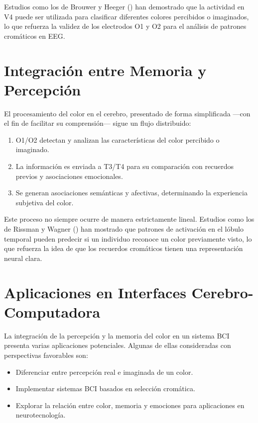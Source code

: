 Estudios como los de Brouwer y Heeger (\citeyear{Brouwer_Heeger_2013}) han demostrado que la actividad en V4 puede ser utilizada para clasificar diferentes colores percibidos o imaginados, lo que refuerza la validez de los electrodos O1 y O2 para el análisis de patrones cromáticos en EEG.

\newpage

\section{Integración entre Memoria y Percepción}
El procesamiento del color en el cerebro, presentado de forma simplificada —con el fin de facilitar su comprensión— sigue un flujo distribuido:
\begin{enumerate}
    \item O1/O2 detectan y analizan las características del color percibido o imaginado.
    \item La información es enviada a T3/T4 para su comparación con recuerdos previos y asociaciones emocionales.
    \item Se generan asociaciones semánticas y afectivas, determinando la experiencia subjetiva del color.
\end{enumerate}

Este proceso no siempre ocurre de manera estrictamente lineal. Estudios como los de Rissman y Wagner (\citeyear{Rissman_Wagner_2012}) han mostrado que patrones de activación en el lóbulo temporal pueden predecir si un individuo reconoce un color previamente visto, lo que refuerza la idea de que los recuerdos cromáticos tienen una representación neural clara.

\section{Aplicaciones en Interfaces Cerebro-Computadora}

La integración de la percepción y la memoria del color en un sistema BCI presenta varias aplicaciones potenciales. Algunas de ellas consideradas con perspectivas favorables son:

\begin{itemize}
    \item Diferenciar entre percepción real e imaginada de un color.
    \item Implementar sistemas BCI basados en selección cromática.
    \item Explorar la relación entre color, memoria y emociones para aplicaciones en neurotecnología.
\end{itemize}

